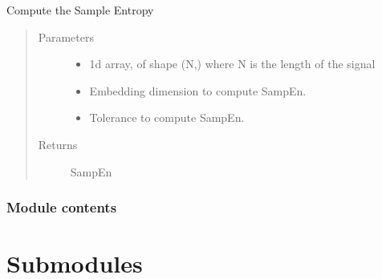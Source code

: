 \documentclass[letterpaper,10pt,english]{sphinxmanual}
\begin{document}

\begin{fulllineitems}
\label{\detokenize{pobm.spo2:pobm.spo2.single_biomarkers.sampen}}
Compute the Sample Entropy
\begin{quote}\begin{description}
\item[{Parameters}] \leavevmode\begin{itemize}
\item {} 
 \textendash{} 1\sphinxhyphen{}d array, of shape (N,) where N is the length of the signal

\item {} 
 \textendash{} Embedding dimension to compute SampEn.

\item {} 
 \textendash{} Tolerance to compute SampEn.

\end{itemize}

\item[{Returns}] \leavevmode
SampEn

\end{description}\end{quote}

\end{fulllineitems}



\subsubsection{Module contents}
\label{\detokenize{pobm.spo2:module-pobm.spo2}}\label{\detokenize{pobm.spo2:module-contents}}

\section{Submodules}
\label{\detokenize{pobm:submodules}}
\end{document}

